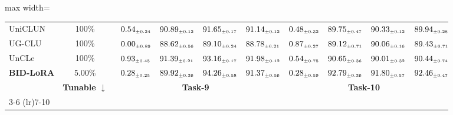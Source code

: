 \begin{table}[!htbp]
\begin{adjustbox}{max width=\textwidth}
\begin{tabular}{l|c|cccc|cccc}
UniCLUN & 100\% & $\kern6pt0.54_{\scriptscriptstyle \pm 0.24}\kern-6pt$ & \colorbox{yellow!35}{$\kern6pt90.89_{\scriptscriptstyle \pm 0.12}\kern-6pt$} & $\kern6pt91.65_{\scriptscriptstyle \pm 0.17}\kern-6pt$ & $\kern6pt91.14_{\scriptscriptstyle \pm 0.12}\kern-6pt$ & $\kern6pt0.48_{\scriptscriptstyle \pm 0.32}\kern-6pt$ & $\kern6pt89.75_{\scriptscriptstyle \pm 0.47}\kern-6pt$ & \colorbox{yellow!35}{$\kern6pt90.33_{\scriptscriptstyle \pm 0.12}\kern-6pt$} & $\kern6pt89.94_{\scriptscriptstyle \pm 0.28}\kern-6pt$ \\
UG-CLU & 100\% & $\kern6pt0.00_{\scriptscriptstyle \pm 0.89}\kern-6pt$ & $\kern6pt88.62_{\scriptscriptstyle \pm 0.56}\kern-6pt$ & $\kern6pt89.10_{\scriptscriptstyle \pm 0.24}\kern-6pt$ & $\kern6pt88.78_{\scriptscriptstyle \pm 0.21}\kern-6pt$ & $\kern6pt0.87_{\scriptscriptstyle \pm 0.27}\kern-6pt$ & $\kern6pt89.12_{\scriptscriptstyle \pm 0.71}\kern-6pt$ & $\kern6pt90.06_{\scriptscriptstyle \pm 0.16}\kern-6pt$ & $\kern6pt89.43_{\scriptscriptstyle \pm 0.71}\kern-6pt$ \\
UnCLe & 100\% & $\kern6pt0.93_{\scriptscriptstyle \pm 0.45}\kern-6pt$ & \colorbox{green!25}{$\kern6pt91.39_{\scriptscriptstyle \pm 0.21}\kern-6pt$} & \colorbox{yellow!35}{$\kern6pt93.16_{\scriptscriptstyle \pm 0.17}\kern-6pt$} & \colorbox{green!25}{$\kern6pt91.98_{\scriptscriptstyle \pm 0.12}\kern-6pt$} & $\kern6pt0.54_{\scriptscriptstyle \pm 0.75}\kern-6pt$ & $\kern6pt90.65_{\scriptscriptstyle \pm 0.36}\kern-6pt$ & $\kern6pt90.01_{\scriptscriptstyle \pm 0.32}\kern-6pt$ & \colorbox{yellow!35}{$\kern6pt90.44_{\scriptscriptstyle \pm 0.74}\kern-6pt$} \\
\midrule
\rowcolor{pink!15}
\textbf{BID-LoRA} & 5.00\% & $\kern6pt0.28_{\scriptscriptstyle \pm 0.25}\kern-6pt$ & $\kern6pt89.92_{\scriptscriptstyle \pm 0.36}\kern-6pt$ & \colorbox{green!25}{$\kern6pt94.26_{\scriptscriptstyle \pm 0.58}\kern-6pt$} & \colorbox{yellow!35}{$\kern6pt91.37_{\scriptscriptstyle \pm 0.56}\kern-6pt$} & $\kern6pt0.28_{\scriptscriptstyle \pm 0.59}\kern-6pt$ & \colorbox{green!25}{$\kern6pt92.79_{\scriptscriptstyle \pm 0.36}\kern-6pt$} & \colorbox{green!25}{$\kern6pt91.80_{\scriptscriptstyle \pm 0.57}\kern-6pt$} & \colorbox{green!25}{$\kern6pt92.46_{\scriptscriptstyle \pm 0.47}\kern-6pt$} \\
\midrule
\addlinespace[0.05cm]
\midrule
\multirow{2}{*}{\textbf{Method}} & \multirow{2}{*}{\textbf{Tunable} $\downarrow$}
& \multicolumn{4}{c|}{\textbf{Task-9}} & \multicolumn{4}{c}{\textbf{Task-10}} \\
\cmidrule(lr){3-6} \cmidrule(lr){7-10}

\end{tabular}
\end{adjustbox}
\end{table}
